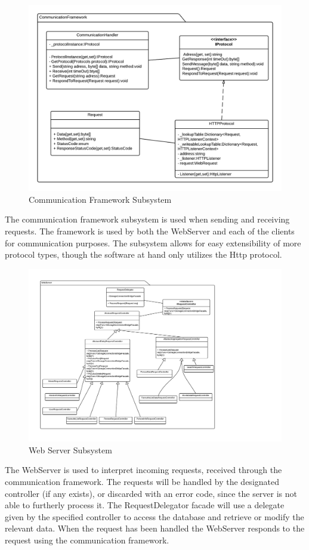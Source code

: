 \begin{figure}[H]
\includegraphics[scale=0.2]{img/SDD/CommunicationFrameworkSubsystem.png}
\caption{Communication Framework Subsystem}
\label{fig:CommunicationFramework}
\end{figure}
The communication framework subsystem is used when sending and receiving requests. The framework is used by both the WebServer and each of the clients for communication purposes. The subsystem allows for easy extensibility of more protocol types, though the software at hand only utilizes the Http protocol.

\begin{figure}[H]
\includegraphics[scale=0.2]{img/SDD/NewWebserverSubsystem.png}
\caption{Web Server Subsystem}
\label{fig:WebServer}
\end{figure}
The WebServer is used to interpret incoming requests, received through the communication framework. The requests will be handled by the designated controller (if any exists), or discarded with an error code, since the server is not able to furtherly process it.
The RequestDelegator facade will use a delegate given by the specified controller to access the database and retrieve or modify the relevant data. When the request has been handled the WebServer responds to the request using the communication framework.


